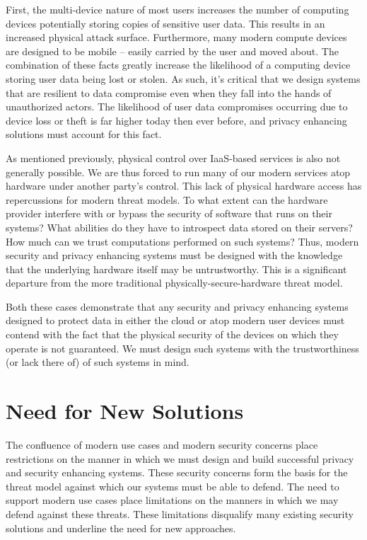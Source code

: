 First, the multi-device nature of most users increases the number of
computing devices potentially storing copies of sensitive user
data. This results in an increased physical attack
surface. Furthermore, many modern compute devices are designed to be
mobile -- easily carried by the user and moved about. The combination
of these facts greatly increase the likelihood of a computing device
storing user data being lost or stolen. As such, it's critical that we
design systems that are resilient to data compromise even when they
fall into the hands of unauthorized actors. The likelihood of user
data compromises occurring due to device loss or theft is far higher
today then ever before, and privacy enhancing solutions must account
for this fact.

As mentioned previously, physical control over IaaS-based services is
also not generally possible. We are thus forced to run many of our
modern services atop hardware under another party's control. This lack
of physical hardware access has repercussions for modern threat
models. To what extent can the hardware provider interfere with or
bypass the security of software that runs on their systems? What
abilities do they have to introspect data stored on their servers? How
much can we trust computations performed on such systems?  Thus,
modern security and privacy enhancing systems must be designed with
the knowledge that the underlying hardware itself may be
untrustworthy. This is a significant departure from the more
traditional physically-secure-hardware threat model.

Both these cases demonstrate that any security and privacy enhancing
systems designed to protect data in either the cloud or atop modern
user devices must contend with the fact that the physical security of
the devices on which they operate is not guaranteed. We must design
such systems with the trustworthiness (or lack there of) of such
systems in mind.

\section{Need for New Solutions}
\label{chap:challenges:solutions}

The confluence of modern use cases and modern security concerns place
restrictions on the manner in which we must design and build
successful privacy and security enhancing systems. These security
concerns form the basis for the threat model against which our systems
must be able to defend. The need to support modern use cases place
limitations on the manners in which we may defend against these
threats. These limitations disqualify many existing security solutions
and underline the need for new approaches.

